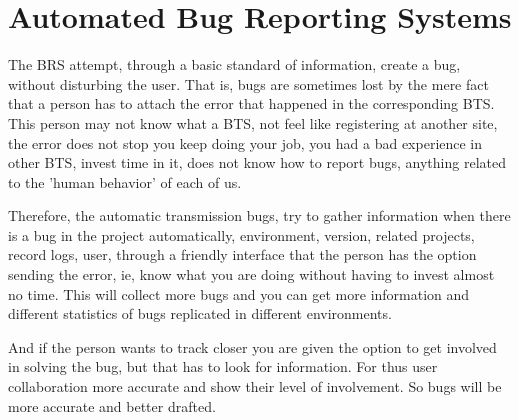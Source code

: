 \documentclass[11pt]{scrartcl}
\begin{document}
\section{Automated Bug Reporting Systems}
\label{sec:auto-brs}

\par The BRS attempt, through a basic standard of information, create a bug, without disturbing the user. That is, bugs are sometimes lost by the mere fact that a person has to attach the error that happened in the corresponding BTS. This person may not know what a BTS, not feel like registering at another site, the error does not stop you keep doing your job, you had a bad experience in other BTS, invest time in it, does not know how to report bugs, anything related to the 'human behavior' of each of us.

\par Therefore, the automatic transmission bugs, try to gather information when there is a bug in the project automatically, environment, version, related projects, record logs, user, through a friendly interface that the person has the option sending the error, ie, know what you are doing without having to invest almost no time. This will collect more bugs and you can get more information and different statistics of bugs replicated in different environments.

\par And if the person wants to track closer you are given the option to get involved in solving the bug, but that has to look for information. For thus user collaboration more accurate and show their level of involvement. So bugs will be more accurate and better drafted.

\end{document}
